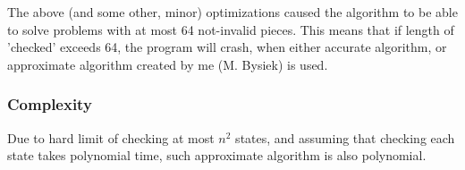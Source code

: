 The above (and some other, minor) optimizations caused the algorithm to be able to solve problems
with at most 64 not-invalid pieces. This means that if length of 'checked' exceeds 64, the program
will crash, when either accurate algorithm, or approximate algorithm created by me (M. Bysiek) is used.

\subsubsection{Complexity}
Due to hard limit of checking at most $n^2$ states, and assuming that checking each state takes
polynomial time, such approximate algorithm is also polynomial.
